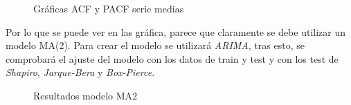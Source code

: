 \begin{figure}[H]
	\centering
	\caption{Gráficas ACF y PACF serie medias}
	\label{fig:21}
\end{figure}

Por lo que se puede ver en las gráfica, parece que claramente se debe utilizar un modelo MA(2). Para crear el modelo se utilizará \textit{ARIMA}, tras esto, se comprobará el ajuste del modelo con los datos de train y test y con los test de \textit{Shapiro}, \textit{Jarque-Bera} y \textit{Box-Pierce}.

\begin{figure}[H]
	\centering
	\caption{Resultados modelo MA2}
	\label{fig:22}
\end{figure}

